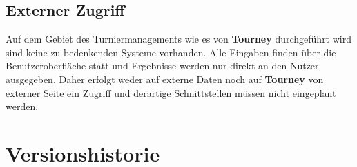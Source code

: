 \documentclass[11pt]{article}
\begin{document}

\subsection{Externer Zugriff}

Auf dem Gebiet des Turniermanagements wie es von \textbf{Tourney} durchgeführt wird sind keine zu bedenkenden Systeme vorhanden. Alle Eingaben finden über die Benutzeroberfläche statt und Ergebnisse werden nur direkt an den Nutzer ausgegeben. Daher erfolgt weder auf externe Daten noch auf \textbf{Tourney} von externer Seite ein Zugriff und derartige Schnittstellen müssen nicht eingeplant werden.

\newpage

\section{Versionshistorie}
\end{document}
